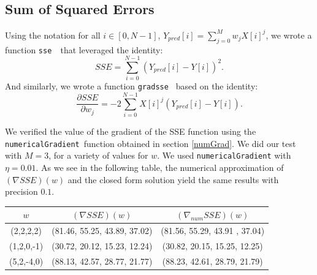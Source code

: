 \subsection{Sum of Squared Errors}
Using the notation for all $i \in [0,N-1]$, $Y_{pred}[i] = \sum_{j = 0}^M w_j X[i]^j$, we wrote a function {\tt sse } that leveraged the identity:
$$SSE = \sum_{i = 0}^{N-1} (Y_{pred}[i] - Y[i]) ^2.$$ 
And similarly, we wrote a function {\tt gradsse } based on the identity:
$$\frac{\partial SSE}{\partial w_j} = -2 \sum_{i = 0}^{N-1} X[i]^j (Y_{pred}[i] - Y[i]).$$ 

We verified the value of the gradient of the SSE function using the {\tt numericalGradient} function obtained in section \ref{numGrad}. We did our test with $M = 3$, for a variety of values for $w$. We used  {\tt numericalGradient} with $\eta = 0.01$. As we see in the following table, the numerical approximation of $(\nabla SSE) (w)$ and the closed form solution yield the same results with precision $0.1$. 

\begin{center}
  \begin{tabular}{| c  | c |c |}
    \hline
 $w$ & $(\nabla SSE) (w)$ &  $(\nabla_{num}SSE)(w)$ \\ \hline
 (2,2,2,2)  &  (81.46,  55.25,  43.89,  37.02) & (81.56,  55.29,  43.91 ,  37.04) \\ \hline
(1,2,0,-1) &  (30.72,  20.12,  15.23,  12.24)  & (30.82,  20.15,  15.25,  12.25) \\ \hline
(5,2,-4,0) & (88.13,  42.57,  28.77,  21.77) & (88.23,  42.61,  28.79,  21.79) \\
    \hline
  \end{tabular}
\end{center}

